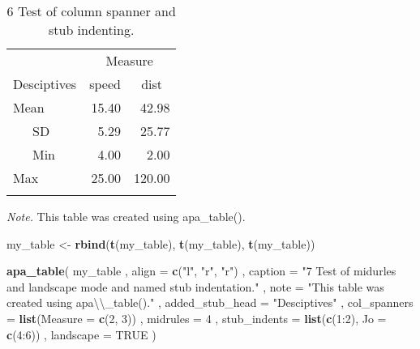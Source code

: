 \documentclass[english,man]{apa6}
\newenvironment{Shaded}{\begin{snugshade}}{\end{snugshade}}
\newcommand{\KeywordTok}[1]{\textcolor[rgb]{0.13,0.29,0.53}{\textbf{{#1}}}}
\newcommand{\DataTypeTok}[1]{\textcolor[rgb]{0.13,0.29,0.53}{{#1}}}
\newcommand{\DecValTok}[1]{\textcolor[rgb]{0.00,0.00,0.81}{{#1}}}
\newcommand{\CharTok}[1]{\textcolor[rgb]{0.31,0.60,0.02}{{#1}}}
\newcommand{\StringTok}[1]{\textcolor[rgb]{0.31,0.60,0.02}{{#1}}}
\newcommand{\OtherTok}[1]{\textcolor[rgb]{0.56,0.35,0.01}{{#1}}}
\newcommand{\NormalTok}[1]{{#1}}
\theoremstyle{definition}
\theoremstyle{definition}
\theoremstyle{definition}
\theoremstyle{remark}
\begin{document}
\begin{table}[tbp]
\begin{center}
\begin{threeparttable}
\caption{\label{tab:unnamed-chunk-5}6 Test of column spanner and stub indenting.}
\begin{tabular}{lrr}
\toprule
 & \multicolumn{2}{c}{Measure} \\
\cmidrule(r){2-3}
Desciptives & \multicolumn{1}{c}{speed} & \multicolumn{1}{c}{dist}\\
\midrule
Mean & 15.40 & 42.98\\
\ \ \ SD & 5.29 & 25.77\\
\ \ \ Min & 4.00 & 2.00\\
Max & 25.00 & 120.00\\
\bottomrule
\addlinespace
\end{tabular}
\begin{tablenotes}[para]
\textit{Note.} This table was created using apa\_table().
\end{tablenotes}
\end{threeparttable}
\end{center}
\end{table}

\begin{Shaded}
\begin{Highlighting}[]
\NormalTok{my_table <-}\StringTok{ }\KeywordTok{rbind}\NormalTok{(}\KeywordTok{t}\NormalTok{(my_table), }\KeywordTok{t}\NormalTok{(my_table), }\KeywordTok{t}\NormalTok{(my_table))}

\KeywordTok{apa_table}\NormalTok{(}
  \NormalTok{my_table}
  \NormalTok{, }\DataTypeTok{align =} \KeywordTok{c}\NormalTok{(}\StringTok{"l"}\NormalTok{, }\StringTok{"r"}\NormalTok{, }\StringTok{"r"}\NormalTok{)}
  \NormalTok{, }\DataTypeTok{caption =} \StringTok{"7 Test of midurles and landscape mode and named stub indentation."}
  \NormalTok{, }\DataTypeTok{note =} \StringTok{"This table was created using apa}\CharTok{\textbackslash{}\textbackslash{}}\StringTok{_table()."}
  \NormalTok{, }\DataTypeTok{added_stub_head =} \StringTok{"Desciptives"}
  \NormalTok{, }\DataTypeTok{col_spanners =} \KeywordTok{list}\NormalTok{(}\DataTypeTok{Measure =} \KeywordTok{c}\NormalTok{(}\DecValTok{2}\NormalTok{, }\DecValTok{3}\NormalTok{))}
  \NormalTok{, }\DataTypeTok{midrules =} \DecValTok{4}
  \NormalTok{, }\DataTypeTok{stub_indents =} \KeywordTok{list}\NormalTok{(}\KeywordTok{c}\NormalTok{(}\DecValTok{1}\NormalTok{:}\DecValTok{2}\NormalTok{), }\DataTypeTok{Jo =} \KeywordTok{c}\NormalTok{(}\DecValTok{4}\NormalTok{:}\DecValTok{6}\NormalTok{))}
  \NormalTok{, }\DataTypeTok{landscape =} \OtherTok{TRUE}
\NormalTok{)}
\end{Highlighting}
\end{Shaded}
\end{document}
